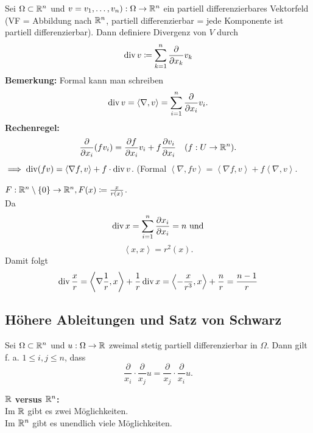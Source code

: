 \begin{definition}[Divergenz]
	Sei $ \Omega \subset \mathbb{R} ^n $ und $ v = v_1, \dotsc, v_n) : \Omega \to \mathbb{R} ^n $ ein partiell differenzierbares Vektorfeld (VF = Abbildung nach $ \mathbb{R} ^n $, partiell differenzierbar = jede Komponente ist partiell differenzierbar).
	Dann definiere Divergenz von $ V $ durch
	\[
		\operatorname{div} v \coloneqq \sum_{k=1}^{n} \frac{ \partial }{ \partial x_k } v_k
	\]
	\textbf{Bemerkung:} Formal kann man schreiben
	\[
		\operatorname{div} v = \left< \nabla , v \right> = \sum_{i=1}^{n} \frac{ \partial }{ \partial x_i } v_i.
	\]
	\textbf{Rechenregel:}
	\[
		\frac{ \partial }{ \partial x_i } (f v_i) = \frac{\partial f }{ \partial x_i } v_i + f \frac{ \partial v_i }{ \partial x_i } \quad (f : U \to \mathbb{R} ^n ).
	\]
	$ \implies \operatorname{div} (f v) = \left< \nabla f, v \right> + f \cdot \operatorname{div} v $.
	(Formal $ \left< \nabla , fv \right> = \left<\nabla  f, v \right> + f \left<\nabla , v \right> $.
\end{definition}

\begin{example*}
	$ F : \mathbb{R} ^n \setminus \left\{ 0 \right\} \to \mathbb{R} ^n, F(x) \coloneqq \frac{ x }{ r(x) }  $.\\
	Da
	\[
		\operatorname{div} x = \sum_{i=1}^{n} \frac{ \partial x_i }{ \partial x_i } = n \text{ und} 
	\]
	\[
		\left<x, x \right> = r^2(x).
	\]
	Damit folgt
	\[
		\operatorname{div} \frac{ x }{ r } = \left< \nabla \frac{ 1 }{ r } , x \right> + \frac{ 1 }{ r } \operatorname{div} x = \left< - \frac{ x }{ r^3 } , x \right> + \frac{ n }{ r }  = \frac{ n - 1 }{ r } 
	\]
\end{example*}

\subsection{Höhere Ableitungen und Satz von Schwarz}
\begin{theorem}[Schwarz]
	Sei $ \Omega \subset \mathbb{R} ^n $ und $ u : \Omega \to \mathbb{R}  $ zweimal stetig partiell differenzierbar in $ \Omega $.
	Dann gilt f. a. $ 1 \leq i, j \leq n $, dass
	\[
		\frac{ \partial }{ x_i } \cdot \frac{ \partial }{ x_j } u = \frac{ \partial }{ x_j } \cdot \frac{ \partial }{ x_i } u.
	\]
	
\end{theorem}

\textbf{$ \mathbb{R}  $ versus $ \mathbb{R} ^n $:}\\
Im $ \mathbb{R}  $ gibt es zwei Möglichkeiten.\\
Im $ \mathbb{R} ^n $ gibt es unendlich viele Möglichkeiten.

